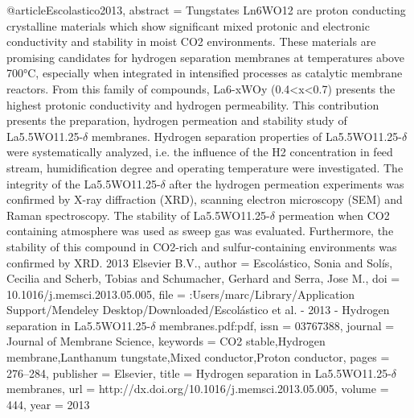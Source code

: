 @article{Escolastico2013,
abstract = {Tungstates Ln6WO12 are proton conducting crystalline materials which show significant mixed protonic and electronic conductivity and stability in moist CO2 environments. These materials are promising candidates for hydrogen separation membranes at temperatures above 700°C, especially when integrated in intensified processes as catalytic membrane reactors. From this family of compounds, La6-xWOy (0.4{\textless}x{\textless}0.7) presents the highest protonic conductivity and hydrogen permeability. This contribution presents the preparation, hydrogen permeation and stability study of La5.5WO11.25-$\delta$ membranes. Hydrogen separation properties of La5.5WO11.25-$\delta$ were systematically analyzed, i.e. the influence of the H2 concentration in feed stream, humidification degree and operating temperature were investigated. The integrity of the La5.5WO11.25-$\delta$ after the hydrogen permeation experiments was confirmed by X-ray diffraction (XRD), scanning electron microscopy (SEM) and Raman spectroscopy. The stability of La5.5WO11.25-$\delta$ permeation when CO2 containing atmosphere was used as sweep gas was evaluated. Furthermore, the stability of this compound in CO2-rich and sulfur-containing environments was confirmed by XRD. {\textcopyright} 2013 Elsevier B.V.},
author = {Escol{\'{a}}stico, Sonia and Sol{\'{i}}s, Cecilia and Scherb, Tobias and Schumacher, Gerhard and Serra, Jose M.},
doi = {10.1016/j.memsci.2013.05.005},
file = {:Users/marc/Library/Application Support/Mendeley Desktop/Downloaded/Escol{\'{a}}stico et al. - 2013 - Hydrogen separation in La5.5WO11.25-$\delta$ membranes.pdf:pdf},
issn = {03767388},
journal = {Journal of Membrane Science},
keywords = {CO2 stable,Hydrogen membrane,Lanthanum tungstate,Mixed conductor,Proton conductor},
pages = {276--284},
publisher = {Elsevier},
title = {{Hydrogen separation in La5.5WO11.25-$\delta$ membranes}},
url = {http://dx.doi.org/10.1016/j.memsci.2013.05.005},
volume = {444},
year = {2013}
}
